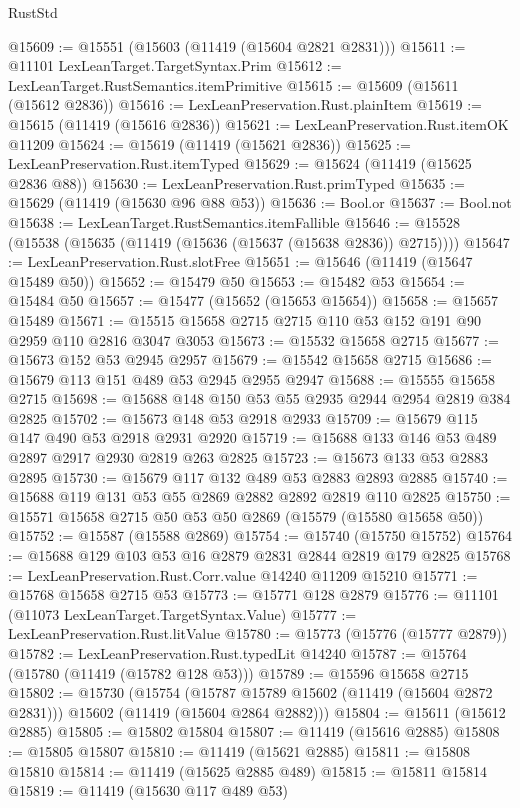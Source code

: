 \begin{lexlean}{RustStd}
\begin{coremodule}
@15609 := @15551 (@15603 (@11419 (@15604 @2821 @2831)))
@15611 := @11101 LexLeanTarget.TargetSyntax.Prim
@15612 := LexLeanTarget.RustSemantics.itemPrimitive
@15615 := @15609 (@15611 (@15612 @2836))
@15616 := LexLeanPreservation.Rust.plainItem
@15619 := @15615 (@11419 (@15616 @2836))
@15621 := LexLeanPreservation.Rust.itemOK @11209
@15624 := @15619 (@11419 (@15621 @2836))
@15625 := LexLeanPreservation.Rust.itemTyped
@15629 := @15624 (@11419 (@15625 @2836 @88))
@15630 := LexLeanPreservation.Rust.primTyped
@15635 := @15629 (@11419 (@15630 @96 @88 @53))
@15636 := Bool.or
@15637 := Bool.not
@15638 := LexLeanTarget.RustSemantics.itemFallible
@15646 := @15528 (@15538 (@15635 (@11419 (@15636 (@15637 (@15638 @2836)) @2715))))
@15647 := LexLeanPreservation.Rust.slotFree
@15651 := @15646 (@11419 (@15647 @15489 @50))
@15652 := @15479 @50
@15653 := @15482 @53
@15654 := @15484 @50
@15657 := @15477 (@15652 (@15653 @15654))
@15658 := @15657 @15489
@15671 := @15515 @15658 @2715 @2715 @110 @53 @152 @191 @90 @2959 @110 @2816 @3047 @3053
@15673 := @15532 @15658 @2715
@15677 := @15673 @152 @53 @2945 @2957
@15679 := @15542 @15658 @2715
@15686 := @15679 @113 @151 @489 @53 @2945 @2955 @2947
@15688 := @15555 @15658 @2715
@15698 := @15688 @148 @150 @53 @55 @2935 @2944 @2954 @2819 @384 @2825
@15702 := @15673 @148 @53 @2918 @2933
@15709 := @15679 @115 @147 @490 @53 @2918 @2931 @2920
@15719 := @15688 @133 @146 @53 @489 @2897 @2917 @2930 @2819 @263 @2825
@15723 := @15673 @133 @53 @2883 @2895
@15730 := @15679 @117 @132 @489 @53 @2883 @2893 @2885
@15740 := @15688 @119 @131 @53 @55 @2869 @2882 @2892 @2819 @110 @2825
@15750 := @15571 @15658 @2715 @50 @53 @50 @2869 (@15579 (@15580 @15658 @50))
@15752 := @15587 (@15588 @2869)
@15754 := @15740 (@15750 @15752)
@15764 := @15688 @129 @103 @53 @16 @2879 @2831 @2844 @2819 @179 @2825
@15768 := LexLeanPreservation.Rust.Corr.value @14240 @11209 @15210
@15771 := @15768 @15658 @2715 @53
@15773 := @15771 @128 @2879
@15776 := @11101 (@11073 LexLeanTarget.TargetSyntax.Value)
@15777 := LexLeanPreservation.Rust.litValue
@15780 := @15773 (@15776 (@15777 @2879))
@15782 := LexLeanPreservation.Rust.typedLit @14240
@15787 := @15764 (@15780 (@11419 (@15782 @128 @53)))
@15789 := @15596 @15658 @2715
@15802 := @15730
    (@15754
      (@15787 @15789 @15602 (@11419 (@15604 @2872 @2831)))
      @15602
      (@11419 (@15604 @2864 @2882)))
@15804 := @15611 (@15612 @2885)
@15805 := @15802 @15804
@15807 := @11419 (@15616 @2885)
@15808 := @15805 @15807
@15810 := @11419 (@15621 @2885)
@15811 := @15808 @15810
@15814 := @11419 (@15625 @2885 @489)
@15815 := @15811 @15814
@15819 := @11419 (@15630 @117 @489 @53)

\end{coremodule}
\end{lexlean}
